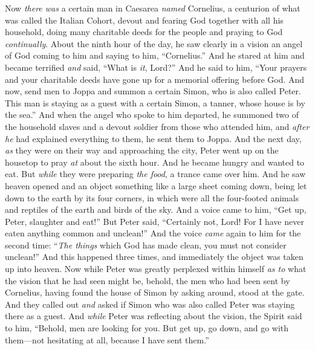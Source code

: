 \begin{biblechapter} %
 Now \textit{there was} a certain man in Caesarea \textit{named} Cornelius, a centurion of what was called the Italian Cohort,
\verse devout and fearing God together with all his household, doing many charitable deeds for the people and praying to God \textit{continually}.
\verse About the ninth hour of the day, he saw clearly in a vision an angel of God coming to him and saying to him, “Cornelius.”
\verse And he stared at him and became terrified \textit{and} said, “What is \textit{it}, Lord?” And he said to him, “Your prayers and your charitable deeds have gone up for a memorial offering before God.
\verse And now, send men to Joppa and summon a certain Simon, who is also called Peter.
\verse This man is staying as a guest with a certain Simon, a tanner, whose house is by the sea.”
\verse And when the angel who spoke to him departed, he summoned two of the household slaves and a devout soldier from those who attended him,
\verse and \textit{after he} had explained everything to them, he sent them to Joppa.
 And the next day, \textit{as} they were on their way and approaching the city, Peter went up on the housetop to pray \textit{at} about the sixth hour.
\verse And he became hungry and wanted to eat. But \textit{while} they were preparing \textit{the food}, a trance came over him.
\verse And he saw heaven opened and an object something like a large sheet coming down, being let down to the earth by its four corners,
\verse in which were all the four-footed animals and reptiles of the earth and birds of the sky.
\verse And a voice came to him, “Get up, Peter, slaughter and eat!”
\verse But Peter said, “Certainly not, Lord! For I have never eaten anything common and unclean!”
\verse And the voice \textit{came} again to him for the second time: “\textit{The things} which God has made clean, you must not consider unclean!”
\verse And this happened three times, and immediately the object was taken up into heaven.
\verse Now while Peter was greatly perplexed within himself \textit{as to} what the vision that he had seen might be, behold, the men who had been sent by Cornelius, having found the house of Simon by asking around, stood at the gate.
\verse And they called out \textit{and} asked if Simon who was also called Peter was staying there as a guest.
\verse And \textit{while} Peter was reflecting about the vision, the Spirit said to him, “Behold, men are looking for you.
\verse But get up, go down, and go with them—not hesitating at all, because I have sent them.”

\end{biblechapter}
